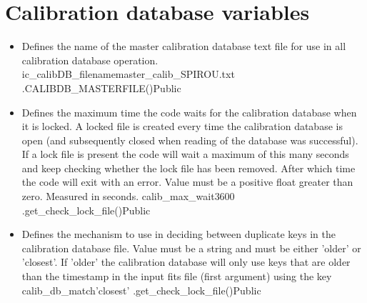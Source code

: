 \clearpage
\newpage
\section{Calibration database variables}
\label{ch:variables:calibdb}

\begin{itemize}

\item \label{text:ic_calibDB_filename} 
{Defines the name of the master calibration database text file for use in all calibration database operation.}
{ic\_calibDB\_filename}{master\_calib{\hskip 0pt}\_SPIROU.txt}
{\AllRecipes}{\constantsfile}{\spirouConst.CALIBDB\_MASTERFILE()}{Public}


\item {}
{Defines the maximum time the code waits for the calibration database when it is locked. A locked file is created every time the calibration database is open (and subsequently closed when reading of the database was successful). If a lock file is present the code will wait a maximum of this many seconds and keep checking whether the lock file has been removed. After which time the code will exit with an error. Value must be a positive float greater than zero. Measured in seconds.}
{calib\_max\_wait}{3600}
{\AllRecipes}{\constantsfile}{\spirouCDB.get\_check\_lock\_file()}{Public}


\item {}
{Defines the mechanism to use in deciding between duplicate keys in the calibration database file. Value must be a string and must be either 'older' or 'closest'. If 'older' the calibration database will only use keys that are older than the timestamp in the input fits file (first argument) using the key }
{calib\_db\_match}{'closest'}
{\AllRecipes}{\constantsfile}{\spirouCDB.get\_check\_lock\_file()}{Public}

\end{itemize}








